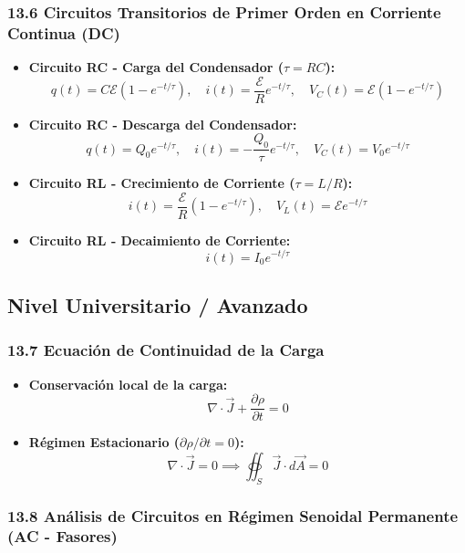\documentclass[11pt,a4paper]{article}
\begin{document}
\subsubsection*{13.6 Circuitos Transitorios de Primer Orden en Corriente Continua (DC)}

\begin{itemize}
  \item \textbf{Circuito RC - Carga del Condensador ($\tau = RC$):}
  \[
    q(t) = C\mathcal{E} (1 - e^{-t/\tau}), \quad i(t) = \frac{\mathcal{E}}{R} e^{-t/\tau}, \quad V_C(t) = \mathcal{E}(1 - e^{-t/\tau})
  \]
  \item \textbf{Circuito RC - Descarga del Condensador:}
  \[
    q(t) = Q_0 e^{-t/\tau}, \quad i(t) = -\frac{Q_0}{\tau} e^{-t/\tau}, \quad V_C(t) = V_0 e^{-t/\tau}
  \]
  \item \textbf{Circuito RL - Crecimiento de Corriente ($\tau = L/R$):}
  \[
    i(t) = \frac{\mathcal{E}}{R} (1 - e^{-t/\tau}), \quad V_L(t) = \mathcal{E} e^{-t/\tau}
  \]
  \item \textbf{Circuito RL - Decaimiento de Corriente:}
  \[
    i(t) = I_0 e^{-t/\tau}
  \]
\end{itemize}

\subsection*{Nivel Universitario / Avanzado}

\subsubsection*{13.7 Ecuación de Continuidad de la Carga}

\begin{itemize}
  \item \textbf{Conservación local de la carga:}
  \[
    \nabla \cdot \vec{J} + \frac{\partial \rho}{\partial t} = 0
  \]
  \item \textbf{Régimen Estacionario ($\partial\rho/\partial t = 0$):}
  \[
    \nabla \cdot \vec{J} = 0 \implies \oiint_S \vec{J} \cdot d\vec{A} = 0
  \]
\end{itemize}

\subsubsection*{13.8 Análisis de Circuitos en Régimen Senoidal Permanente (AC - Fasores)}
\end{document}
